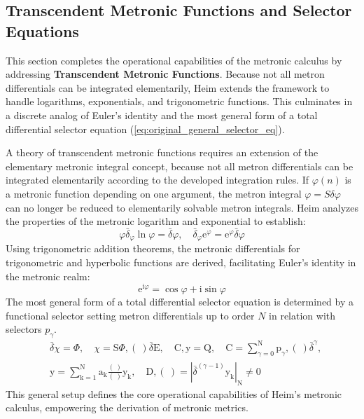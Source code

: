 \documentclass[12pt]{article}
\begin{document}
\subsection{Transcendent Metronic Functions and Selector Equations}
\label{sec:transcendent_functions}

This section completes the operational capabilities of the metronic calculus by addressing \textbf{Transcendent Metronic Functions}. Because not all metron differentials can be integrated elementarily, Heim extends the framework to handle logarithms, exponentials, and trigonometric functions. This culminates in a discrete analog of Euler's identity and the most general form of a total differential selector equation (\eqref{eq:original_general_selector_eq}).

A theory of transcendent metronic functions requires an extension of the elementary metronic integral concept, because not all metron differentials can be integrated elementarily according to the developed integration rules. If \( \varphi(n) \) is a metronic function depending on one argument, the metron integral \( \varphi = S \delta \varphi \) can no longer be reduced to elementarily solvable metron integrals. Heim analyzes the properties of the metronic logarithm and exponential to establish:
\begin{equation}
\varphi \bar{\delta}_\varphi \ln \varphi = \bar{\delta}\varphi, \quad \bar{\delta}_\varphi \mathrm{e}^\varphi = \mathrm{e}^\varphi \bar{\delta}\varphi \tag{81}
\end{equation}
Using trigonometric addition theorems, the metronic differentials for trigonometric and hyperbolic functions are derived, facilitating Euler's identity in the metronic realm:
\begin{equation}
\mathrm{e}^{\mathrm{i}\varphi} = \cos \varphi + \mathrm{i} \sin \varphi \tag{81a}
\end{equation}
The most general form of a total differential selector equation is determined by a functional selector setting metron differentials up to order \( N \) in relation with selectors \( p_\gamma \).
\begin{equation}
\begin{aligned}
& \bar{\delta}\chi = \Phi, \quad \chi = \mathrm{S}\Phi, (\ ) \bar{\delta}\mathrm{E}, \quad \mathrm{C}, \mathrm{y} = \mathrm{Q}, \quad \mathrm{C} = \sum_{\gamma=0}^\mathrm{N} \mathrm{p}_\gamma, (\ ) \bar{\delta}^\gamma, \\
& \mathrm{y} = \sum_{\mathrm{k}=1}^\mathrm{N} \mathrm{a_k} \frac{(\ )}{(\ )} \mathrm{y_k}, \quad \mathrm{D}, (\ ) = \left| \bar{\delta}^{(\gamma-1)} \mathrm{y_k} \right|_\mathrm{N} \neq 0
\end{aligned} \tag{82}
\label{eq:original_general_selector_eq}
\end{equation}
This general setup defines the core operational capabilities of Heim's metronic calculus, empowering the derivation of metronic metrics.
\end{document}
